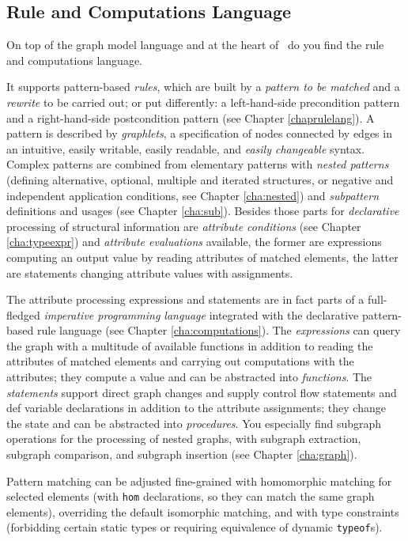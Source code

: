 \subsection{Rule and Computations Language}
On top of the graph model language and at the heart of \GrG\ do you find the rule and computations language.

It supports pattern-based \emph{rules}, which are built by a \emph{pattern to be matched} and a \emph{rewrite} to be carried out; or put differently: a left-hand-side precondition pattern and a right-hand-side postcondition pattern (see Chapter \ref{chaprulelang}).
A pattern is described by \emph{graphlets}, a specification of nodes connected by edges in an intuitive, easily writable, easily readable, and \emph{easily changeable} syntax.
Complex patterns are combined from elementary patterns with \emph{nested patterns} (defining alternative, optional, multiple and iterated structures, or negative and independent application conditions, see Chapter \ref{cha:nested}) and \emph{subpattern} definitions and usages (see Chapter \ref{cha:sub}).
Besides those parts for \emph{declarative} processing of structural information are \emph{attribute conditions} (see Chapter \ref{cha:typeexpr}) and \emph{attribute evaluations} available, the former are expressions computing an output value by reading attributes of matched elements, the latter are statements changing attribute values with assignments. 

The attribute processing expressions and statements are in fact parts of a full-fledged \emph{imperative programming language} integrated with the declarative pattern-based rule language (see Chapter \ref{cha:computations}).
The \emph{expressions} can query the graph with a multitude of available functions in addition to reading the attributes of matched elements and carrying out computations with the attributes; they compute a value and can be abstracted into \emph{functions}.
The \emph{statements} support direct graph changes and supply control flow statements and def variable declarations in addition to the attribute assignments; they change the state and can be abstracted into \emph{procedures}.
You especially find subgraph operations for the processing of nested graphs, with subgraph extraction, subgraph comparison, and subgraph insertion (see Chapter \ref{cha:graph}). 

Pattern matching can be adjusted fine-grained with homomorphic matching for selected elements (with \texttt{hom} declarations, so they can match the same graph elements), overriding the default isomorphic matching, and with type constraints (forbidding certain static types or requiring equivalence of dynamic \texttt{typeof}s).

